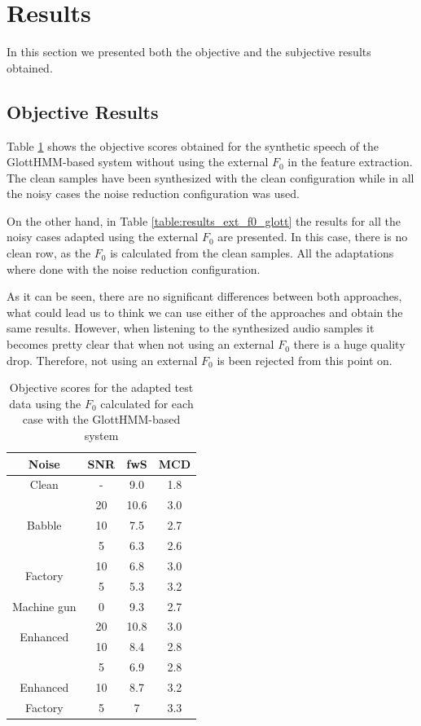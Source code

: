 \section{Results}
\label{results}
In this section we presented both the objective and the subjective results obtained.

\subsection{Objective Results}
\label{results_objective}
Table \ref{table:results_no_ext_f0_glott} shows the objective scores obtained for the synthetic speech of the GlottHMM-based system without using the external $F_{0}$ in the feature extraction.
%
The clean samples have been synthesized with the clean configuration while in all the noisy cases the noise reduction configuration was used. 

On the other hand, in Table \ref{table:results_ext_f0_glott} the results for all the noisy cases adapted using the external $F_{0}$ are presented.
%
In this case, there is no clean row, as the $F_{0}$ is calculated from the clean samples.
%
All the adaptations where done with the noise reduction configuration.

As it can be seen, there are no significant differences between both approaches, what could lead us to think we can use either of the approaches and obtain the same results.
%
However, when listening to the synthesized audio samples it becomes pretty clear that when not using an external $F_{0}$ there is a huge quality drop.
%
Therefore, not using an external $F_{0}$ is been rejected from this point on.



\begin{table}[!htb]
\begin{center}
\begin{tabular}{c c | c | c}
Noise & SNR & fwS & MCD\\
\midrule
\midrule
Clean & - & 9.0 & 1.8\\
\midrule
\multirow{3}{*}{Babble} & 20 & 10.6 & 3.0\\
 & 10 & 7.5 & 2.7\\
 & 5 & 6.3 & 2.6\\
\midrule
\multirow{2}{*}{Factory} & 10 & 6.8 & 3.0\\
 & 5 & 5.3 & 3.2\\
\midrule
Machine gun & 0 & 9.3 & 2.7\\
\midrule
\midrule
\multirow{2}{*}{Enhanced} & 20 & 10.8 & 3.0\\
\multirow{2}{*}{Babble} & 10 & 8.4 & 2.8\\
& 5 & 6.9 & 2.8\\
\midrule
Enhanced & 10 & 8.7 & 3.2\\
Factory & 5 & 7 & 3.3\\
\bottomrule
\end{tabular}
\caption{Objective scores for the adapted test data using the $F_{0}$ calculated for each case with the GlottHMM-based system}
\label{table:results_no_ext_f0_glott}
\end{center}
\end{table}

